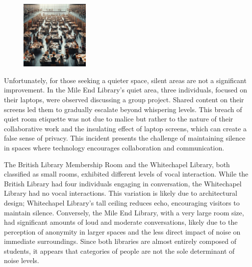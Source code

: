\documentclass{novel}
\begin{document}
\begin{figure} 
    \includegraphics[width=0.3\textwidth]{resources/mileEnd.jpg}
\end{figure}

Unfortunately, for those seeking a quieter space, silent areas are not a significant improvement. In the Mile End Library's quiet area, three individuals, focused on their laptops, were observed discussing a group project. Shared content on their screens led them to gradually escalate beyond whispering levels. This breach of quiet room etiquette was not due to malice but rather to the nature of their collaborative work and the insulating effect of laptop screens, which can create a false sense of privacy. This incident presents the challenge of maintaining silence in spaces where technology encourages collaboration and communication.

The British Library Membership Room and the Whitechapel Library, both classified as small rooms, exhibited different levels of vocal interaction. While the British Library had four individuals engaging in conversation, the Whitechapel Library had no vocal interactions. This variation is likely due to architectural design; Whitechapel Library's tall ceiling reduces echo, encouraging visitors to maintain silence. Conversely, the Mile End Library, with a very large room size, had significant amounts of loud and moderate conversations, likely due to the perception of anonymity in larger spaces and the less direct impact of noise on immediate surroundings. Since both libraries are almost entirely composed of students, it appears that categories of people are not the sole determinant of noise levels.
\end{document}
